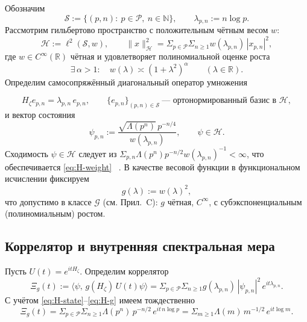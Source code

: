 \documentclass{article}
\numberwithin{equation}{section}
\theoremstyle{plain}
\theoremstyle{definition}
\theoremstyle{remark}
\def\alpha{α}\def\beta{β}\def\gamma{γ}\def\Gamma{Γ}%
\def\infty{∞}\def\partial{∂}\def\sum{Σ}\def\int{∫}%
\begin{document}
Обозначим
\begin{equation}\label{eq:H-index}
\mathcal S:=\{(p,n):\ p\in\mathcal P,\ n\in\mathbb N\},\qquad \lambda_{p,n}:=n\log p .
\end{equation}
Рассмотрим гильбертово пространство с положительным чётным весом \(w\):
\begin{equation}\label{eq:H-space}
\mathcal H:=\ell^2(\mathcal S,w),\qquad 
\|x\|_{\mathcal H}^2=\sum_{p\in\mathcal P}\sum_{n\ge 1} w(\lambda_{p,n})\,|x_{p,n}|^2,
\end{equation}
где \(w\in C^\infty(\mathbb R)\) чётная и удовлетворяет полиномиальной оценке роста \cite{GelfandShilov1968}
\begin{equation}\label{eq:H-weight}
\exists\,\alpha>1:\quad w(\lambda)\asymp (1+\lambda^2)^{\alpha}\qquad(\lambda\in\mathbb R).
\end{equation}
Определим самосопряжённый диагональный оператор умножения

\begin{equation}\label{eq:H-operator}
H_\zeta e_{p,n}=\lambda_{p,n}\,e_{p,n},\qquad \{e_{p,n}\}_{(p,n)\in\mathcal S}\ \text{— ортонормированный базис в }\mathcal H ,
\end{equation}
и вектор состояния
\begin{equation}\label{eq:H-state}
\psi_{p,n}:=\frac{\sqrt{\Lambda(p^n)}\,p^{-n/4}}{w(\lambda_{p,n})},\qquad \psi\in\mathcal H .
\end{equation}
Сходимость \(\psi\in\mathcal H\) следует из \(\sum_{p,n}\Lambda(p^n)p^{-n/2}w(\lambda_{p,n})^{-1}<\infty\), что обеспечивается \eqref{eq:H-weight} ~\cite{Simon2005}. 
В качестве весовой функции в функциональном исчислении фиксируем
\begin{equation}\label{eq:H-g}
g(\lambda):=w(\lambda)^2 ,
\end{equation}
что допустимо в классе \(\mathcal G\) (см. Прил.~C): \(g\) чётная, \(C^\infty\), с субэкспоненциальным (полиномиальным) ростом.

\subsection*{Коррелятор и внутренняя спектральная мера}

Пусть \(U(t)=e^{itH_\zeta}\). Определим коррелятор
\begin{equation}\label{eq:H-Xi}
\Xi_g(t):=\langle \psi,\,g(H_\zeta)\,U(t)\psi\rangle
=\sum_{p\in\mathcal P}\sum_{n\ge 1} g(\lambda_{p,n})\,|\psi_{p,n}|^2\,e^{it\lambda_{p,n}} .
\end{equation}
С учётом \eqref{eq:H-state}–\eqref{eq:H-g} имеем тождественно ~\cite{Connes1999, BerryKeating1999}
\begin{equation}\label{eq:H-Xi-explicit}
\Xi_g(t)=\sum_{p\in\mathcal P}\sum_{n\ge 1}\Lambda(p^n)\,p^{-n/2}\,e^{it\,n\log p}
=\sum_{m\ge 1}\Lambda(m)\,m^{-1/2}\,e^{it\log m}.
\end{equation}
\end{document}
